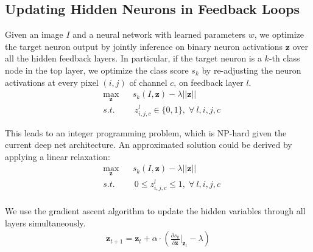 \subsection{Updating Hidden Neurons in Feedback Loops}
Given an image $I$ and a neural network with learned parameters $w$, we optimize the target neuron output by jointly inference on binary neuron activations $\mathbf{z}$ over all the hidden feedback layers. In particular, if the target neuron is a $k$-th class node in the top layer, we optimize the class score $s_k$ by re-adjusting the {\color{red} neuron activations} at every {\color{red} pixel $(i,j)$ of channel $c$, on feedback layer $l$.}
\vspace{-3pt}
\begin{equation}
\begin{aligned}
& \max_\mathbf{z} & & s_k(I, \mathbf{z}) - \lambda ||\mathbf{z}|| \\
& s.t. & & \ z^l_{i,j,c} \in \{0, 1\}, \; \forall\ l, i, j, c
\end{aligned}
\end{equation}
\vspace{-5pt}

This leads to an integer programming problem, which is NP-hard given the current deep net architecture. An approximated solution could be derived by applying a linear relaxation:
\begin{equation}
\begin{aligned}
& \max_\mathbf{z} & & s_k(I, \mathbf{z}) - \lambda ||\mathbf{z}|| \\
& s.t. & & \ 0 \leq z^l_{i,j,c} \leq 1, \; \forall\ l, i, j, c\\
\end{aligned}
\end{equation}

We use the gradient ascent algorithm to update the hidden variables through all layers simultaneously.
\begin{equation}
\begin{aligned}
\mathbf{z}_{t+1} = \mathbf{z}_t + \alpha \cdot (\frac{\partial s_k}{\partial \mathbf{z}} |_{\mathbf{z}_t} - \lambda)
\end{aligned}
\end{equation}

